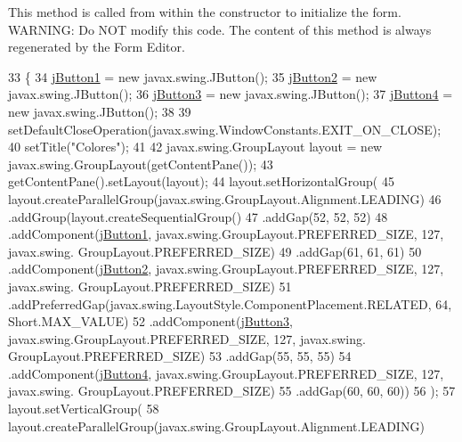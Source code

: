 This method is called from within the constructor to initialize the form. W\+A\+R\+N\+I\+NG\+: Do N\+OT modify this code. The content of this method is always regenerated by the Form Editor. 
\begin{DoxyCode}
33     \{ 
34         \mbox{\hyperlink{class_ejemplo3_1_1_ventana_a9c9557e7e1d01b6a2c59303420a82960}{jButton1}} = \textcolor{keyword}{new} javax.swing.JButton();
35         \mbox{\hyperlink{class_ejemplo3_1_1_ventana_a57fb2c553f7b9dfe7b817d42e931d02d}{jButton2}} = \textcolor{keyword}{new} javax.swing.JButton();
36         \mbox{\hyperlink{class_ejemplo3_1_1_ventana_ad5cc36db674ee054410bb5d33de59124}{jButton3}} = \textcolor{keyword}{new} javax.swing.JButton();
37         \mbox{\hyperlink{class_ejemplo3_1_1_ventana_a22a478dbd87be7d99b7972cf00dbbf26}{jButton4}} = \textcolor{keyword}{new} javax.swing.JButton();
38  
39         setDefaultCloseOperation(javax.swing.WindowConstants.EXIT\_ON\_CLOSE);
40         setTitle(\textcolor{stringliteral}{"Colores"});
41  
42         javax.swing.GroupLayout layout = \textcolor{keyword}{new} javax.swing.GroupLayout(getContentPane());
43         getContentPane().setLayout(layout);
44         layout.setHorizontalGroup(
45             layout.createParallelGroup(javax.swing.GroupLayout.Alignment.LEADING)
46             .addGroup(layout.createSequentialGroup()
47                 .addGap(52, 52, 52)
48                 .addComponent(\mbox{\hyperlink{class_ejemplo3_1_1_ventana_a9c9557e7e1d01b6a2c59303420a82960}{jButton1}}, javax.swing.GroupLayout.PREFERRED\_SIZE, 127, javax.swing.
      GroupLayout.PREFERRED\_SIZE)
49                 .addGap(61, 61, 61)
50                 .addComponent(\mbox{\hyperlink{class_ejemplo3_1_1_ventana_a57fb2c553f7b9dfe7b817d42e931d02d}{jButton2}}, javax.swing.GroupLayout.PREFERRED\_SIZE, 127, javax.swing.
      GroupLayout.PREFERRED\_SIZE)
51                 .addPreferredGap(javax.swing.LayoutStyle.ComponentPlacement.RELATED, 64, Short.MAX\_VALUE)
52                 .addComponent(\mbox{\hyperlink{class_ejemplo3_1_1_ventana_ad5cc36db674ee054410bb5d33de59124}{jButton3}}, javax.swing.GroupLayout.PREFERRED\_SIZE, 127, javax.swing.
      GroupLayout.PREFERRED\_SIZE)
53                 .addGap(55, 55, 55)
54                 .addComponent(\mbox{\hyperlink{class_ejemplo3_1_1_ventana_a22a478dbd87be7d99b7972cf00dbbf26}{jButton4}}, javax.swing.GroupLayout.PREFERRED\_SIZE, 127, javax.swing.
      GroupLayout.PREFERRED\_SIZE)
55                 .addGap(60, 60, 60))
56         );
57         layout.setVerticalGroup(
58             layout.createParallelGroup(javax.swing.GroupLayout.Alignment.LEADING)

\end{DoxyCode}
